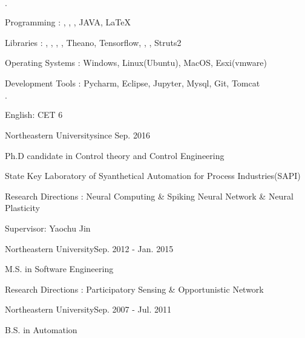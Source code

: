 \documentclass{joel_cv}
\begin{document}
\begin{sectionItemize}{$\cdot$}
	\item Programming : , , , JAVA, \LaTeX
	\item Libraries : , , , , Theano, Tensorflow, , , Struts2
    \item Operating Systems : Windows, Linux(Ubuntu), MacOS, Esxi(vmware)
    \item Development Tools : Pycharm, Eclipse, Jupyter, Mysql, Git, Tomcat
\end{sectionItemize}


%
%

\begin{sectionItemize}{$\cdot$}
	\item English: CET 6
\end{sectionItemize}


%
%

\begin{sectionContentSimple}{Northeastern University}{since Sep. 2016}
	\item Ph.D candidate in Control theory and Control Engineering
	\item State Key Laboratory of Syanthetical Automation for Process Industries(SAPI)
    \item Research Directions : Neural Computing \& Spiking Neural Network \& Neural Plasticity
	\item Supervisor: Yaochu Jin
\end{sectionContentSimple}

\begin{sectionContentSimple}{Northeastern University}{Sep. 2012 - Jan. 2015}
	\item M.S. in Software Engineering
	\item Research Directions : Participatory Sensing \& Opportunistic Network
\end{sectionContentSimple}

\begin{sectionContentSimple}{Northeastern University}{Sep. 2007 - Jul. 2011}
	\item B.S. in Automation
\end{sectionContentSimple}
\end{document}
